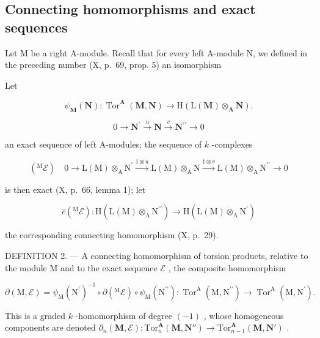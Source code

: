 \subsection{Connecting homomorphisms and exact sequences}

Let M be a right A-module. Recall that for every left A-module N, we defined in the preceding number (X, p.~69, prop. 5) an isomorphism

Let

\[
\psi_ {\mathbf {M}} (\mathbf {N}): \operatorname{Tor} ^ {\mathbf {A}} (\mathbf {M}, \mathbf {N}) \rightarrow \mathrm{H} (\mathrm{L} (\mathbf {M}) \otimes_ {\mathbf {A}} \mathbf {N}).\tag{ε}
\]

\[
0 \rightarrow \mathbf {N} ^ {\prime} \xrightarrow {u} \mathbf {N} \xrightarrow {v} \mathbf {N} ^ {\prime \prime} \rightarrow 0
\]

an exact sequence of left A-modules; the sequence of \(k\) -complexes

\[
\left(^ {\mathrm{M}} \mathcal {E}\right) \quad 0 \longrightarrow \mathrm{L} (\mathrm{M}) \otimes_ {\mathrm{A}} \mathrm{N} ^ {\prime} \xrightarrow {1 \otimes u} \mathrm{L} (\mathrm{M}) \otimes_ {\mathrm{A}} \mathrm{N} \xrightarrow {1 \otimes v} \mathrm{L} (\mathrm{M}) \otimes_ {\mathrm{A}} \mathrm{N} ^ {\prime \prime} \longrightarrow 0
\]

is then exact (X, p.~66, lemma 1); let

\[
\hat {c} \left(^ {\mathrm{M}} \mathcal {E}\right): \mathrm{H} (\mathrm{L} (\mathrm{M}) \otimes_ {\mathrm{A}} \mathrm{N} ^ {\prime \prime}) \rightarrow \mathrm{H} (\mathrm{L} (\mathrm{M}) \otimes_ {\mathrm{A}} \mathrm{N} ^ {\prime})
\]

the corresponding connecting homomorphism (X, p.~29).

DEFINITION 2. --- A connecting homomorphism of torsion products, relative to the module M and to the exact sequence \(\mathcal{E}\) , the composite homomorphism

\[
\partial (\mathrm{M}, \mathcal {E}) = \psi_ {\mathrm{M}} \left(\mathrm{N} ^ {\prime}\right) ^ {- 1} \circ \partial \left(^ {\mathrm{M}} \mathcal {E}\right) \circ \psi_ {\mathrm{M}} \left(\mathrm{N} ^ {\prime \prime}\right): \operatorname{Tor} ^ {\mathrm{A}} \left(\mathrm{M}, \mathrm{N} ^ {\prime \prime}\right)\rightarrow \operatorname{Tor} ^ {\mathrm{A}} \left(\mathrm{M}, \mathrm{N} ^ {\prime}\right).
\]

This is a graded \(k\) -homomorphism of degree \((-1)\) , whose homogeneous components are denoted \(\partial_n(\mathbf{M}, \mathcal{E}) : \mathrm{Tor}_n^{\mathbf{A}}(\mathbf{M}, \mathbf{N}'') \to \mathrm{Tor}_{n-1}^{\mathbf{A}}(\mathbf{M}, \mathbf{N}')\) .

